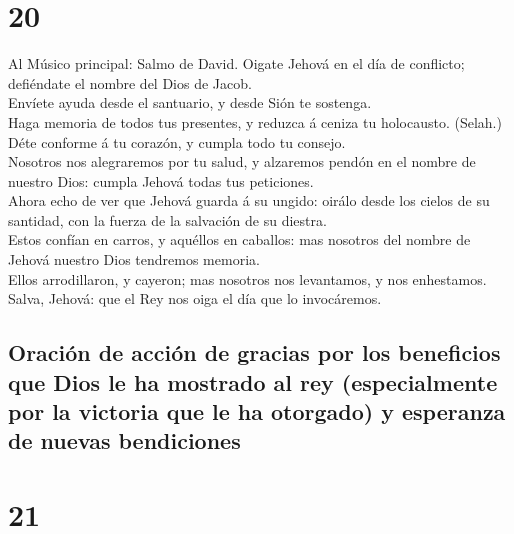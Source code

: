 \hypertarget{section-19}{%
\section{20}\label{section-19}}

 Al Músico principal: Salmo de David. Oigate Jehová en el
día de conflicto; defiéndate el nombre del Dios de Jacob.\\
 Envíete ayuda desde el santuario, y desde Sión te
sostenga.\\
 Haga memoria de todos tus presentes, y reduzca á ceniza
tu holocausto. (Selah.)\\
 Déte conforme á tu corazón, y cumpla todo tu consejo.\\
 Nosotros nos alegraremos por tu salud, y alzaremos pendón
en el nombre de nuestro Dios: cumpla Jehová todas tus peticiones.\\
 Ahora echo de ver que Jehová guarda á su ungido: oirálo
desde los cielos de su santidad, con la fuerza de la salvación de su
diestra.\\
 Estos confían en carros, y aquéllos en caballos: mas
nosotros del nombre de Jehová nuestro Dios tendremos memoria.\\
 Ellos arrodillaron, y cayeron; mas nosotros nos
levantamos, y nos enhestamos.\\
 Salva, Jehová: que el Rey nos oiga el día que lo
invocáremos.

\hypertarget{oraciuxf3n-de-acciuxf3n-de-gracias-por-los-beneficios-que-dios-le-ha-mostrado-al-rey-especialmente-por-la-victoria-que-le-ha-otorgado-y-esperanza-de-nuevas-bendiciones}{%
\subsection{Oración de acción de gracias por los beneficios que Dios le
ha mostrado al rey (especialmente por la victoria que le ha otorgado) y
esperanza de nuevas
bendiciones}\label{oraciuxf3n-de-acciuxf3n-de-gracias-por-los-beneficios-que-dios-le-ha-mostrado-al-rey-especialmente-por-la-victoria-que-le-ha-otorgado-y-esperanza-de-nuevas-bendiciones}}

\hypertarget{section-20}{%
\section{21}\label{section-20}}

